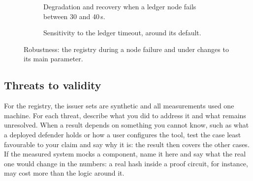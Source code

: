 \begin{figure}[!ht]
  \centering
  \begin{subfigure}[b]{0.48\linewidth}
    \centering
    \caption{Degradation and recovery when a ledger node fails between 30 and 40\,s.}\label{guide:fig:robustness-fault}
  \end{subfigure}\hfill
  \begin{subfigure}[b]{0.48\linewidth}
    \centering
    \caption{Sensitivity to the ledger timeout, around its default.}\label{guide:fig:robustness-sensitivity}
  \end{subfigure}
  \caption{Robustness: the registry during a node failure and under changes to its main parameter.}
  \label{guide:fig:robustness}
\end{figure}

\subsection{Threats to validity}\label{guide:chapters:validity}
For the registry, the issuer sets are synthetic and all measurements used one machine. For each threat, describe what you did to address it and what remains unresolved. When a result depends on something you cannot know, such as what a deployed defender holds or how a user configures the tool, test the case least favourable to your claim and say why it is: the result then covers the other cases. If the measured system mocks a component, name it here and say what the real one would change in the numbers: a real hash inside a proof circuit, for instance, may cost more than the logic around it.

